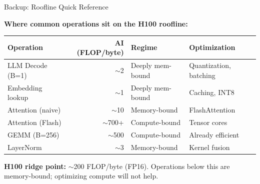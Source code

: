 \documentclass[aspectratio=169, 12pt]{beamer}
\begin{document}
\appendix

\begin{frame}{Backup: Roofline Quick Reference}
\note{
}

\footnotesize
\textbf{Where common operations sit on the H100 roofline:}

\vspace{0.1cm}
\renewcommand{\arraystretch}{1.15}
\begin{tabular}{@{}lrll@{}}
  \toprule
  \textbf{Operation} & \textbf{AI (FLOP/byte)} & \textbf{Regime} & \textbf{Optimization} \\
  \midrule
  LLM Decode (B=1) & $\sim$2     & \textcolor{errorstroke}{Deeply mem-bound}  & Quantization, batching \\
  Embedding lookup  & $\sim$1     & \textcolor{errorstroke}{Deeply mem-bound}  & Caching, INT8 \\
  Attention (naive) & $\sim$10    & \textcolor{errorstroke}{Memory-bound}      & FlashAttention \\
  Attention (Flash) & $\sim$700+  & \textcolor{datastroke}{Compute-bound}     & Tensor cores \\
  GEMM (B=256)      & $\sim$500   & \textcolor{datastroke}{Compute-bound}     & Already efficient \\
  LayerNorm         & $\sim$3     & \textcolor{errorstroke}{Memory-bound}      & Kernel fusion \\
  \bottomrule
\end{tabular}

\vspace{0.1cm}
{\footnotesize\textbf{H100 ridge point:} $\sim$200 FLOP/byte (FP16). Operations below this are memory-bound; optimizing compute will not help.}

\end{frame}
\end{document}
